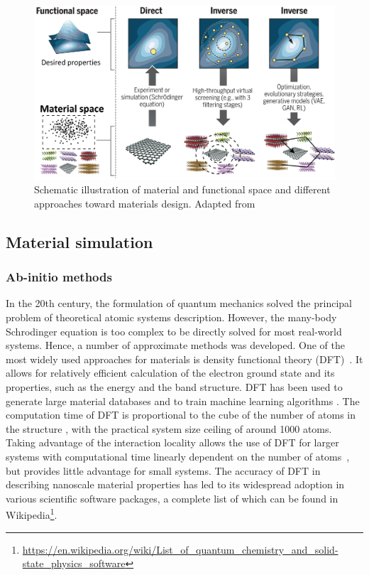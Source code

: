 \begin{figure}[H]
	\noindent
	\centering
	\includegraphics[width=\textwidth]{figures/Property_space_3.png}
	\caption{ Schematic illustration of material and functional space and different approaches toward materials design. Adapted from \cite{sanchez2018inverse}}
	\label{fig:property-space}
\end{figure}

\subsection{Material simulation}
\label{sec:forward}
\subsubsection{Ab-initio methods}
\label{subsec:forward:physics}
In the 20th century, the formulation of quantum mechanics solved the principal problem of theoretical atomic systems description. However, the many-body Schrodinger equation is too complex to be directly solved for most real-world systems. Hence, a number of approximate methods was developed. One of the most widely used approaches for materials is density functional theory (DFT)~\cite{parr1980density}. It allows for relatively efficient calculation of the electron ground state and its properties, such as the energy and the band structure. DFT has been used to generate large material databases \cite{choudhary2022recent} and to train machine learning algorithms \cite{schleder2019dft}. The computation time of DFT is proportional to the cube of the number of atoms in the structure \cite{burke2012perspective, pan2021scaling}, with the practical system size ceiling of around 1000 atoms. Taking advantage of the interaction locality allows the use of DFT for larger systems with computational time linearly dependent on the number of atoms~\cite{nakata2020large}, but provides little advantage for small systems. The accuracy of DFT in describing nanoscale material properties has led to its widespread adoption in various scientific software packages, a complete list of which can be found in Wikipedia\footnote{ \url{https://en.wikipedia.org/wiki/List_of_quantum_chemistry_and_solid-state_physics_software}}. 

